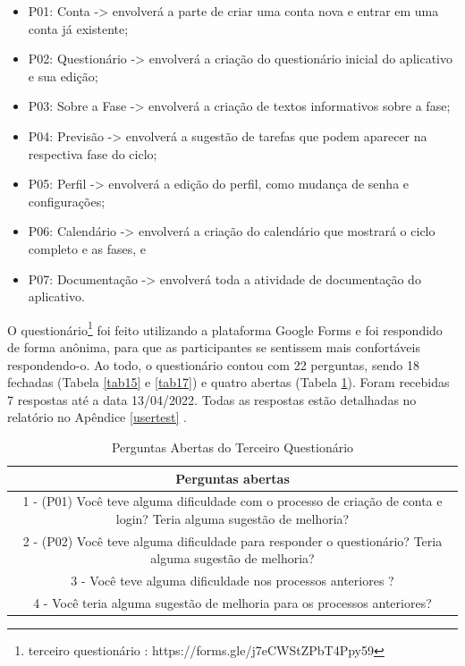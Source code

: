 \begin{itemize}
\item P01: Conta -> envolverá a parte de criar uma conta nova e entrar em uma conta já existente;
\item P02: Questionário -> envolverá a criação do questionário inicial do aplicativo e sua edição;
\item P03: Sobre a Fase -> envolverá a criação de textos informativos sobre a fase;
\item P04: Previsão -> envolverá a sugestão de tarefas que podem aparecer na respectiva fase do ciclo;
\item P05: Perfil -> envolverá a edição do perfil, como mudança de senha e configurações;
\item P06: Calendário -> envolverá a criação do calendário que mostrará o ciclo completo e as fases, e
\item P07: Documentação -> envolverá toda a atividade de documentação do aplicativo.

\end{itemize}

O questionário\footnote{terceiro questionário : https://forms.gle/j7eCWStZPbT4Ppy59} foi feito utilizando a plataforma Google Forms e foi respondido de forma anônima, para que as
participantes se sentissem mais confortáveis respondendo-o. Ao todo, o questionário contou com 22 perguntas, sendo 18 fechadas 
(Tabela \ref{tab15} e \ref{tab17}) e 
quatro abertas (Tabela \ref{tab16}). Foram recebidas 7 respostas até a data 13/04/2022. Todas as respostas estão 
detalhadas no relatório no Apêndice \ref{usertest} .

\begin{table}[ht]
    \centering
    \caption{Perguntas Abertas do Terceiro Questionário}
    \label{tab16}
    \begin{tabular}{c}
        \toprule
        \textbf{Perguntas abertas} \\
        \midrule     
        \begin{minipage} [t] {1\textwidth} 1 - (P01) Você teve alguma dificuldade com o processo de criação de conta e login? Teria alguma sugestão de melhoria?\end{minipage} \\
        \midrule
        \begin{minipage} [t] {1\textwidth} 2 - (P02) Você teve alguma dificuldade para responder o questionário? Teria alguma sugestão de melhoria?\end{minipage}\\
        \midrule
        \begin{minipage} [t] {1\textwidth} 3 - Você teve alguma dificuldade nos processos anteriores ?  \end{minipage}\\
        \midrule
        \begin{minipage} [t] {1\textwidth} 4 - Você teria alguma sugestão de melhoria para os processos anteriores? \end{minipage}\\
        \bottomrule
    \end{tabular} 
\end{table}

